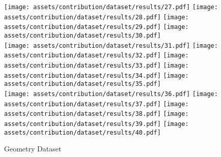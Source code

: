 \documentclass[a4paper, 12pt]{report}
\begin{document}
\begin{figure}
\texttt{[image: assets/contribution/dataset/results/27.pdf]}\hfill
\texttt{[image: assets/contribution/dataset/results/28.pdf]}\hfill
\texttt{[image: assets/contribution/dataset/results/29.pdf]}\hfill
\texttt{[image: assets/contribution/dataset/results/30.pdf]}
\\[\smallskipamount]
\texttt{[image: assets/contribution/dataset/results/31.pdf]}\hfill
\texttt{[image: assets/contribution/dataset/results/32.pdf]}\hfill
\texttt{[image: assets/contribution/dataset/results/33.pdf]}\hfill
\texttt{[image: assets/contribution/dataset/results/34.pdf]}\hfill
\texttt{[image: assets/contribution/dataset/results/35.pdf]}
\\[\smallskipamount]
\texttt{[image: assets/contribution/dataset/results/36.pdf]}\hfill
\texttt{[image: assets/contribution/dataset/results/37.pdf]}\hfill
\texttt{[image: assets/contribution/dataset/results/38.pdf]}\hfill
\texttt{[image: assets/contribution/dataset/results/39.pdf]}\hfill
\texttt{[image: assets/contribution/dataset/results/40.pdf]}
\caption{Geometry Dataset}
\label{fig:geometry-dataset}
\end{figure}
\end{document}

